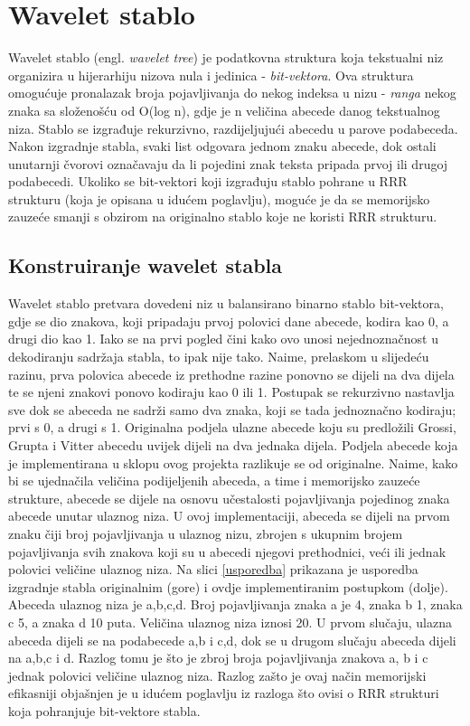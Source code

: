 \section{Wavelet stablo}

Wavelet stablo (engl. \textit{wavelet tree}) je podatkovna struktura koja tekstualni niz organizira u hijerarhiju nizova nula i jedinica - \textit{bit-vektora}. Ova struktura omogućuje pronalazak broja pojavljivanja do nekog indeksa u nizu - \textit{ranga} nekog znaka sa složenošću od O(log n), gdje je n veličina abecede danog tekstualnog niza. 
Stablo se izgrađuje rekurzivno, razdijeljujući abecedu u parove podabeceda. Nakon izgradnje stabla, svaki list odgovara jednom znaku abecede, dok ostali unutarnji čvorovi označavaju da li pojedini znak teksta pripada prvoj ili drugoj podabecedi.
Ukoliko se bit-vektori koji izgrađuju stablo pohrane u RRR strukturu (koja je opisana u idućem poglavlju), moguće je da se memorijsko zauzeće smanji s obzirom na originalno stablo koje ne koristi RRR strukturu.


\subsection{Konstruiranje wavelet stabla}

Wavelet stablo pretvara dovedeni niz u balansirano binarno stablo bit-vektora, gdje se dio znakova, koji pripadaju prvoj polovici dane abecede, kodira kao 0, a drugi dio kao 1. Iako se na prvi pogled čini kako ovo unosi nejednoznačnost u dekodiranju sadržaja stabla, to ipak nije tako. Naime, prelaskom u slijedeću razinu, prva polovica abecede iz prethodne razine ponovno se dijeli na dva dijela te se njeni znakovi ponovo kodiraju kao 0 ili 1. Postupak se rekurzivno nastavlja sve dok se abeceda ne sadrži samo dva znaka, koji se tada jednoznačno kodiraju; prvi s 0, a drugi s 1. 
Originalna podjela ulazne abecede koju su predložili Grossi, Grupta i Vitter \cite{wavelet}  abecedu uvijek dijeli na dva jednaka dijela. Podjela abecede koja je implementirana u sklopu ovog projekta razlikuje se od originalne. Naime, kako bi se ujednačila veličina podijeljenih abeceda, a time i memorijsko zauzeće strukture, abecede se dijele na osnovu učestalosti pojavljivanja pojedinog znaka abecede unutar ulaznog niza. U ovoj implementaciji, abeceda se dijeli na prvom znaku čiji broj pojavljivanja u ulaznog nizu, zbrojen s ukupnim brojem pojavljivanja svih znakova koji su u abecedi njegovi prethodnici, veći ili jednak polovici veličine ulaznog niza.
Na slici \ref{usporedba} prikazana je usporedba izgradnje stabla originalnim (gore) i ovdje implementiranim postupkom (dolje). Abeceda ulaznog niza je {a,b,c,d}. Broj pojavljivanja znaka a je 4, znaka b 1, znaka c 5, a znaka d 10 puta. Veličina ulaznog niza iznosi 20. U prvom slučaju, ulazna abeceda dijeli se na podabecede {a,b} i {c,d}, dok se u drugom slučaju abeceda dijeli na {a,b,c} i {d}. Razlog tomu je što je zbroj broja pojavljivanja znakova a, b i c jednak polovici veličine ulaznog niza.
Razlog zašto je ovaj način memorijski efikasniji objašnjen je u idućem poglavlju iz razloga što ovisi o RRR strukturi koja pohranjuje bit-vektore stabla.

